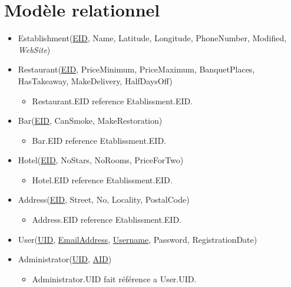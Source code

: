 \documentclass{article}
\begin{document}
\section*{Modèle relationnel}
\begin{itemize}
    
    \item Establishment(\underline{EID}, Name, Latitude, Longitude, PhoneNumber, Modified, \textsl{WebSite})

    \item Restaurant(\underline{EID}, PriceMinimum, PriceMaximum, BanquetPlaces, HasTakeaway, MakeDelivery, HalfDaysOff)

    \begin{itemize}
        \item Restaurant.EID reference Etablissment.EID.
    \end{itemize}

    \item Bar(\underline{EID}, CanSmoke, MakeRestoration)
    
    \begin{itemize}
        \item Bar.EID reference Etablissment.EID.
    \end{itemize}

    \item Hotel(\underline{EID}, NoStars, NoRooms, PriceForTwo)

    \begin{itemize}
        \item Hotel.EID reference Etablissment.EID.
    \end{itemize}

    \item Address(\underline{EID}, Street, No, Locality, PostalCode)

    \begin{itemize}
        \item Address.EID reference Etablissment.EID.
    \end{itemize}

    \item User(\underline{UID}, \underline{EmailAddress}, \underline{Username}, Password, RegistrationDate) 

    \item Administrator(\underline{UID}, \underline{AID}) 

    \begin{itemize}
        \item Administrator.UID fait référence a User.UID.
    \end{itemize}


\end{itemize}
\end{document}
